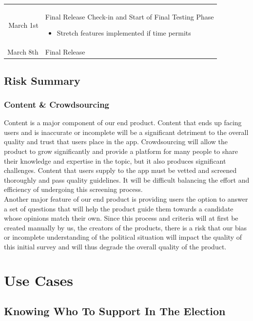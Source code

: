 \documentclass[11pt]{article}
\begin{document}
{\begin{tabular}{r |@{\foo} l}
March 1st & \parbox{\textwidth}{
Final Release Check-in and Start of Final Testing Phase
\vspace{-6pt}
\begin{itemize}
    \setlength\itemsep{0pt}
    \item Stretch features implemented if time permits
\end{itemize}
}\\[15pt]

March 8th & Final Release

\end{tabular}
}

\subsection{Risk Summary}

\subsubsection{Content \& Crowdsourcing}

Content is a major component of our end product. Content that ends up facing users and is inaccurate or incomplete will be a significant detriment to the overall quality and trust that users place in the app. Crowdsourcing will allow the product to grow significantly and provide a platform for many people to share their knowledge and expertise in the topic, but it also produces significant challenges. Content that users supply to the app must be vetted and screened thoroughly and pass quality guidelines. It will be difficult balancing the effort and efficiency of undergoing this screening process. \\

Another major feature of our end product is providing users the option to answer a set of questions that will help the product guide them towards a candidate whose opinions match their own. Since this process and criteria will at first be created manually by us, the creators of the products, there is a risk that our bias or incomplete understanding of the political situation will impact the quality of this initial survey and will thus degrade the overall quality of the product.

\newpage
\section{Use Cases}
\vspace{-10pt}
\subsection{Knowing Who To Support In The Election}
\end{document}
